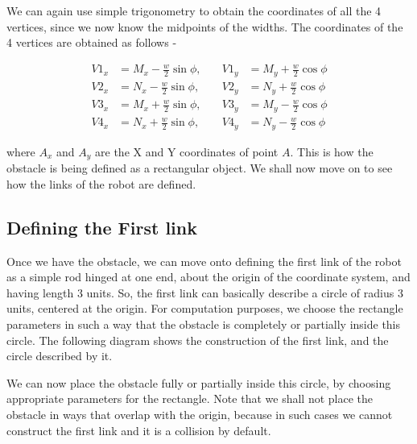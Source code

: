 \documentclass[12pt]{article}
\begin{document}
We can again use simple trigonometry to obtain the coordinates of all the 4 vertices, since we now know the midpoints of the widths.
The coordinates of the 4 vertices are obtained as follows - 

\[
\begin{aligned}
V1_x &= M_x - \frac{w}{2} \sin\phi, \quad &V1_y &= M_y + \frac{w}{2} \cos\phi \\[6pt]
V2_x &= N_x - \frac{w}{2} \sin\phi, \quad &V2_y &= N_y + \frac{w}{2} \cos\phi \\[6pt]
V3_x &= M_x + \frac{w}{2} \sin\phi, \quad &V3_y &= M_y - \frac{w}{2} \cos\phi \\[6pt]
V4_x &= N_x + \frac{w}{2} \sin\phi, \quad &V4_y &= N_y - \frac{w}{2} \cos\phi
\end{aligned}
\]


where $A_x$ and $A_y$ are the X and Y coordinates of point $A$.
This is how the obstacle is being defined as a rectangular object. We shall now move on to see how the links of the robot are defined.
\subsection{Defining the First link}
Once we have the obstacle, we can move onto defining the first link of the robot as a simple rod hinged at one end, about the origin of the coordinate system, and having length 3 units. So, the first link can basically describe a circle of radius 3 units, centered at the origin. For computation purposes, we choose the rectangle parameters in such a way that the obstacle is completely or partially inside this circle. The following diagram shows the construction of the first link, and the circle described by it. 


\begin{center}
\end{center}
We can now place the obstacle fully or partially inside this circle, by choosing appropriate parameters for the rectangle. Note that we shall not place the obstacle in ways that overlap with the origin, because in such cases we cannot construct the first link and it is a collision by default.
\end{document}
